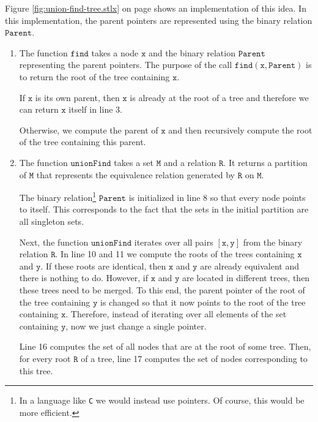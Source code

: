 Figure \ref{fig:union-find-tree.stlx} on page \pageref{fig:union-find-tree.stlx} shows an
implementation of this idea.  In this implementation, the parent pointers are represented using the
binary relation $\mathtt{Parent}$.  
\begin{enumerate}
\item The function $\mathtt{find}$ takes a node $\mathtt{x}$ and the binary relation $\mathtt{Parent}$ 
      representing the parent pointers.  The purpose of the call $\mathtt{find}(\mathtt{x}, \mathtt{Parent})$ is to
      return the root of the tree containing $\mathtt{x}$.

      If $\mathtt{x}$ is its own parent, then $\mathtt{x}$ is already at the root of a tree and therefore 
      we can return $\mathtt{x}$ itself in line 3.

      Otherwise, we compute the parent of $\mathtt{x}$ and then recursively compute the root of the tree
      containing this parent.  
\item The function $\mathtt{unionFind}$ takes a set $\mathtt{M}$ and a relation $\mathtt{R}$.  It returns
      a partition of $\mathtt{M}$ that represents the equivalence relation generated by $\mathtt{R}$ on
      $\mathtt{M}$.

      The binary relation\footnote{
        In a language like \texttt{C} we would instead use pointers.  Of course, this would be more efficient.
      } $\mathtt{Parent}$ is initialized in line 8 so that every node
      points to itself.   This corresponds to the fact that the sets in the initial partition are all
      singleton sets.  

      Next, the function $\mathtt{unionFind}$ iterates over all pairs $[\mathtt{x}, \mathtt{y}]$ from the binary
      relation $\mathtt{R}$.  In line 10 and 11 we compute the roots of the trees containing $\mathtt{x}$ and
      $\mathtt{y}$.  If these roots are identical, then $\mathtt{x}$ and $\mathtt{y}$ are already
      equivalent and there is nothing to do.  However, if $\mathtt{x}$ and $\mathtt{y}$ are located 
      in different trees, then these trees need to be merged.  To this end, the parent pointer of
      the root of the tree containing $\mathtt{y}$ is changed so that it 
      now points to the root of the tree containing $\mathtt{x}$.  Therefore, instead of iterating over all
      elements of the set containing $\mathtt{y}$, now we just change a single pointer.

      Line 16 computes the set of all nodes that are at the root of some tree.  Then, for every root
      $\mathtt{R}$ of a tree, line 17 computes the set of nodes corresponding to this tree.
\end{enumerate}

